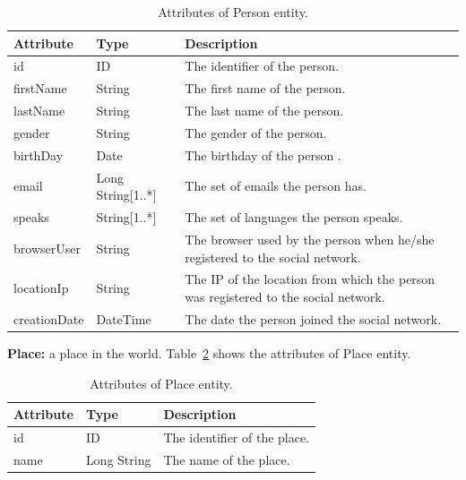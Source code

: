 \begin{table}[H]
    \begin{tabular}{|p{\attributecolumn}|p{\typecolumn}|p{\descriptioncolumn}|}
        \hline
        \textbf{Attribute} & \textbf{Type} & \textbf{Description} \\
        \hline
        id & ID  & The identifier of the person.\\
        \hline
        firstName & String  & The first name of the person.\\
        \hline
        lastName & String  & The last name of the person.\\
        \hline
        gender & String  & The gender of the person.\\
        \hline
        birthDay & Date  & The birthday of the person .\\
        \hline
        email & Long String[1..*]  & The set of emails the person has.\\
        \hline
        speaks & String[1..*]  & The set of languages the person speaks.\\
        \hline
        browserUser & String  & The browser used by the person when he/she registered to the social network.\\
        \hline
        locationIp & String  & The IP of the location from which the person was registered to the social network.\\
        \hline
        creationDate & DateTime  & The date the person joined the social network.\\
        \hline
    \end{tabular}
    \caption{Attributes of Person entity.}
    \label{table:person}
\end{table}


{\flushleft \textbf{Place:}} a place in the world.
Table~\ref{table:place} shows the attributes of Place entity.

\begin{table}[H]
    \begin{tabular}{|p{\attributecolumn}|p{\typecolumn}|p{\descriptioncolumn}|}
        \hline
        \textbf{Attribute} & \textbf{Type} & \textbf{Description} \\
        \hline
        id & ID  & The identifier of the place.\\
        \hline
        name & Long String  & The name of the place.\\
        \hline
    \end{tabular}
    \caption{Attributes of Place entity.}
    \label{table:place}
\end{table}

